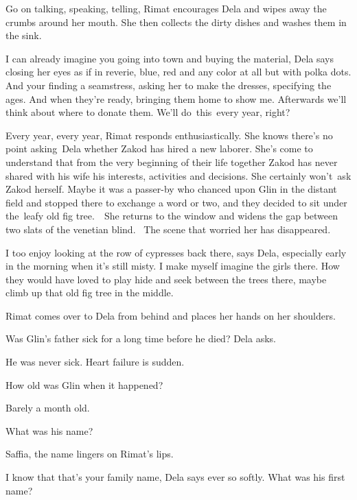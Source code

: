 \documentclass[twoside,11pt]{book}
\begin{document}
{\textquotedbl}Go on talking, speaking, telling,{\textquotedbl} Rimat encourages Dela and wipes away the crumbs around
her mouth. She then collects the dirty dishes and washes them in the sink. 

{\textquotedbl}I can already imagine you going into town and buying the material,{\textquotedbl} Dela says closing her
eyes as if in reverie, {\textquotedbl}blue, red and any color at all but with polka dots. And your finding a
seamstress, asking her to make the dresses, specifying the ages. And when they're ready, bringing them home to show me.
Afterwards we'll think about where to donate them. We'll do\ this\ every year, right?{\textquotedbl}

{\textquotedbl}Every year, every year,{\textquotedbl} Rimat responds enthusiastically. She knows there's no point
asking~Dela whether Zakod has hired a new laborer. She's come to understand that from the very beginning of their life
together Zakod has never shared with his wife his interests, activities and decisions{. }She certainly
won't{\ }ask Zakod herself. Maybe it was a passer-by who chanced upon Glin in the distant field and
stopped there to exchange a word or two, and they decided to sit under the{\ }leafy old fig tree.~\ She
returns to the window and widens the gap between two slats of the venetian blind. ~The scene that worried her has
disappeared. 

{\textquotedbl}I too enjoy looking at the row of cypresses back there,{\textquotedbl} says Dela,
{\textquotedbl}especially early in the morning when it's still misty. I make myself imagine the girls there. How they
would have loved to play hide and seek between the trees there, maybe climb up that old fig tree in the
middle.{\textquotedbl}

Rimat comes over to Dela from behind and places her hands on her shoulders. 

{\textquotedbl}Was Glin's father sick for a long time before he died?{\textquotedbl} Dela asks.

{\textquotedbl}He was never sick. Heart failure is sudden.{\textquotedbl}

{\textquotedbl}How old was Glin when it happened?{\textquotedbl}

{\textquotedbl}Barely a month old.{\textquotedbl}

{\textquotedbl}What was his name?{\textquotedbl}

{\textquotedbl}Saffia,{\textquotedbl} the name lingers on Rimat's lips.

{\textquotedbl}I know that that's your family name,{\textquotedbl} Dela says ever so softly. {\textquotedbl}What was his
first name?{\textquotedbl} 
\end{document}
